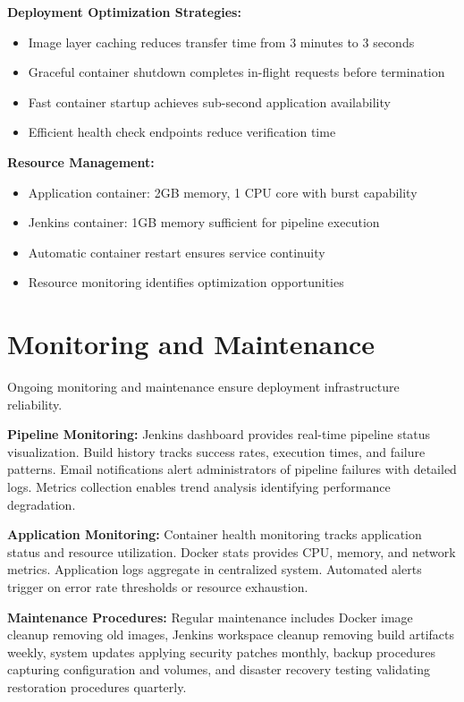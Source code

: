 \textbf{Deployment Optimization Strategies:}
\begin{itemize}
\item Image layer caching reduces transfer time from 3 minutes to 3 seconds
\item Graceful container shutdown completes in-flight requests before termination
\item Fast container startup achieves sub-second application availability
\item Efficient health check endpoints reduce verification time
\end{itemize}

\textbf{Resource Management:}
\begin{itemize}
\item Application container: 2GB memory, 1 CPU core with burst capability
\item Jenkins container: 1GB memory sufficient for pipeline execution
\item Automatic container restart ensures service continuity
\item Resource monitoring identifies optimization opportunities
\end{itemize}

\section{Monitoring and Maintenance}

Ongoing monitoring and maintenance ensure deployment infrastructure reliability.

\textbf{Pipeline Monitoring:} Jenkins dashboard provides real-time pipeline status visualization. Build history tracks success rates, execution times, and failure patterns. Email notifications alert administrators of pipeline failures with detailed logs. Metrics collection enables trend analysis identifying performance degradation.

\textbf{Application Monitoring:} Container health monitoring tracks application status and resource utilization. Docker stats provides CPU, memory, and network metrics. Application logs aggregate in centralized system. Automated alerts trigger on error rate thresholds or resource exhaustion.

\textbf{Maintenance Procedures:} Regular maintenance includes Docker image cleanup removing old images, Jenkins workspace cleanup removing build artifacts weekly, system updates applying security patches monthly, backup procedures capturing configuration and volumes, and disaster recovery testing validating restoration procedures quarterly.

